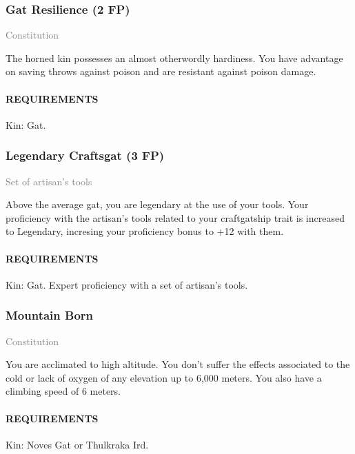        \subsubsection{Gat Resilience (2 FP)} \label{feat::gatresilience}
        \small{\textcolor{gray}{Constitution}}

        \normalsize
        The horned kin possesses an almost otherwordly hardiness.
        You have advantage on saving throws against poison and are resistant against poison damage.
        \paragraph{REQUIREMENTS} Kin: Gat.

        \subsubsection{Legendary Craftsgat (3 FP)} \label{feat::legendarycraftsgat}
        \small{\textcolor{gray}{Set of artisan's tools}}

        \normalsize
        Above the average gat, you are legendary at the use of your tools.
        Your proficiency with the artisan's tools related to your craftgatship trait is increased to Legendary, incresing your proficiency bonus to +12 with them.
        \paragraph{REQUIREMENTS} Kin: Gat. Expert proficiency with a set of artisan's tools.

        \subsubsection{Mountain Born} \label{feat::mountainborn}
        \small{\textcolor{gray}{Constitution}}

        \normalsize
        You are acclimated to high altitude.
        You don't suffer the effects associated to the cold or lack of oxygen of any elevation up to 6,000 meters.
        You also have a climbing speed of 6 meters.
        \paragraph{REQUIREMENTS} Kin: Noves Gat or Thulkraka Ird.

